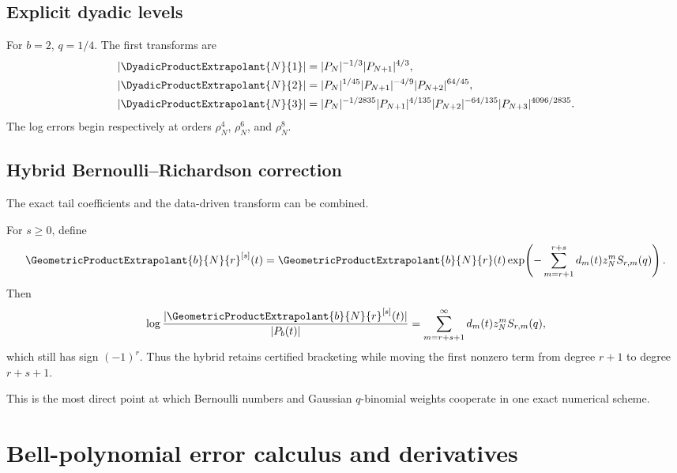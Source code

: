 \documentclass[11pt]{article}
\numberwithin{equation}{section}
\theoremstyle{definition}
\theoremstyle{remark}
\begin{document}
\subsection{Explicit dyadic levels}

For $b=2$, $q=1/4$. The first transforms are
\begin{align}
|\DyadicProductExtrapolant{N}{1}|
&=|P_N|^{-1/3}|P_{N+1}|^{4/3},
\label{p8:eq:r1-dyadic}\\
|\DyadicProductExtrapolant{N}{2}|
&=|P_N|^{1/45}|P_{N+1}|^{-4/9}|P_{N+2}|^{64/45},
\label{p8:eq:r2-dyadic}\\
|\DyadicProductExtrapolant{N}{3}|
&=|P_N|^{-1/2835}|P_{N+1}|^{4/135}
|P_{N+2}|^{-64/135}|P_{N+3}|^{4096/2835}.
\label{p8:eq:r3-dyadic}
\end{align}
The log errors begin respectively at orders $\rho_N^4$, $\rho_N^6$, and $\rho_N^8$.

\subsection{Hybrid Bernoulli--Richardson correction}

The exact tail coefficients and the data-driven transform can be combined.

\begin{corollary}
\label{p8:cor:hybrid}
For $s\ge0$, define
\begin{equation}
\GeometricProductExtrapolant{b}{N}{r}^{[s]}(t)
=\GeometricProductExtrapolant{b}{N}{r}(t)
\exp\!\left(-\sum_{m=r+1}^{r+s}
 d_m(t)z_N^mS_{r,m}(q)\right).
\label{p8:eq:hybrid}
\end{equation}
Then
\begin{equation}
\log\frac{|\GeometricProductExtrapolant{b}{N}{r}^{[s]}(t)|}{|P_b(t)|}
=\sum_{m=r+s+1}^{\infty}d_m(t)z_N^mS_{r,m}(q),
\label{p8:eq:hybrid-error}
\end{equation}
which still has sign $(-1)^r$. Thus the hybrid retains certified bracketing while moving the first nonzero term from degree $r+1$ to degree $r+s+1$.
\end{corollary}

This is the most direct point at which Bernoulli numbers and Gaussian $q$-binomial weights cooperate in one exact numerical scheme.

\section{Bell-polynomial error calculus and derivatives}
\label{p8:sec:bell}
\end{document}
